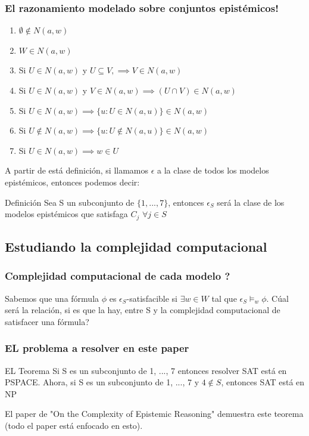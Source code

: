 \documentclass{beamer}
\begin{document}
\begin{frame}
\frametitle{El razonamiento modelado sobre conjuntos epist\'emicos!}
\begin{enumerate}
\item $\emptyset \notin N(a,w)$
\item $W \in N(a,w)$
\item Si $U \in N(a,w)$ y $U \subseteq V, \implies V \in N(a,w)$
\item Si $U \in N(a,w)$ y $V \in N(a,w) \implies (U \cap V) \in N(a,w)$
\item Si $U \in N(a,w) \implies \{u : U \in N(a,u)\} \in N(a,w)$
\item Si $U \notin N(a,w) \implies \{u : U \notin N(a,u)\} \in N(a,w)$
\item Si $U \in N(a,w) \implies w \in U$
\end{enumerate}

A partir de est\'a definici\'on, si llamamos $\epsilon$ a la clase de todos los modelos epist\'emicos, entonces podemos decir:

\begin{block}{Definici\'on}
Sea S un subconjunto de $\{1,...,7\}$, entonces $\epsilon_{S}$ ser\'a la clase de los modelos epist\'emicos que satisfaga $C_{j}$ $\forall j \in S$
\end{block} 
\end{frame}

\subsection{Estudiando la complejidad computacional}

\begin{frame}
\frametitle{Complejidad computacional de cada modelo ?}

Sabemos que una f\'ormula $\phi$ es $\epsilon_{S}$-satisfacible si $\exists w \in W$ tal que $\epsilon_{S} \models_{w} \phi$. C\'ual ser\'a la relaci\'on, si es que la hay, entre S y la complejidad computacional de satisfacer una f\'ormula?
\end{frame}

\begin{frame}
\frametitle{EL problema a resolver en este paper}

\begin{block}{EL Teorema}
 Si S es un subconjunto de {1, ..., 7} entonces resolver SAT est\'a en PSPACE. Ahora, si S es un subconjunto de {1, ..., 7} y $4 \notin S$, entonces SAT est\'a en NP
\end{block}

El paper de "On the Complexity of Epistemic Reasoning" demuestra este teorema (todo el paper est\'a enfocado en esto).
\end{frame}
\end{document}
